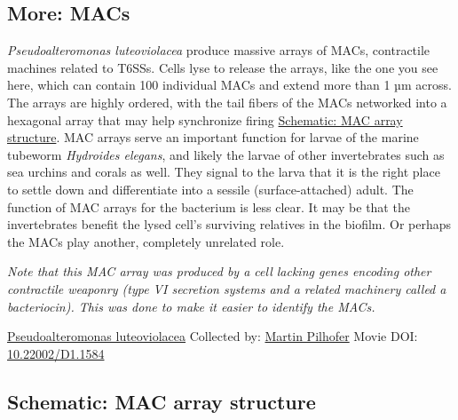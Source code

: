 \documentclass[]{tufte-book}
\begin{document}
\hypertarget{MACs}{%
\subsection*{More: MACs}\label{MACs}}

\emph{Pseudoalteromonas luteoviolacea} produce massive arrays of MACs, contractile machines related to T6SSs. Cells lyse to release the arrays, like the one you see here, which can contain 100 individual MACs and extend more than 1 µm across. The arrays are highly ordered, with the tail fibers of the MACs networked into a hexagonal array that may help synchronize firing \protect\hyperlink{MAC_array_structure}{Schematic: MAC array structure}. MAC arrays serve an important function for larvae of the marine tubeworm \emph{Hydroides elegans}, and likely the larvae of other invertebrates such as sea urchins and corals as well. They signal to the larva that it is the right place to settle down and differentiate into a sessile (surface-attached) adult. The function of MAC arrays for the bacterium is less clear. It may be that the invertebrates benefit the lysed cell's surviving relatives in the biofilm. Or perhaps the MACs play another, completely unrelated role.

\emph{Note that this MAC array was produced by a cell lacking genes encoding other contractile weaponry (type VI secretion systems and a related machinery called a bacteriocin). This was done to make it easier to identify the MACs.}



\hypertarget{htmlwidget-5e06bcb8b268be83add7}{}

\label{fig:9-7b}\protect\hyperlink{tree}{Pseudoalteromonas luteoviolacea} Collected by: \protect\hyperlink{martin_pilhofer}{Martin Pilhofer} Movie DOI: \href{https://doi.org/10.22002/D1.1584}{10.22002/D1.1584}

\hypertarget{MAC_array_structure}{%
\subsection*{Schematic: MAC array structure}\label{MAC_array_structure}}
\end{document}
